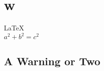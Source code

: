 \documentclass{article}
\begin{document}
               
 
\section{w}          
\LaTeX \,\\ 
 $a^2+b^2=c^2$

\subsection{A Warning or Two}  

\end{document}
